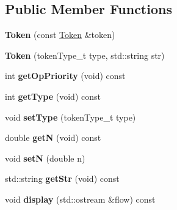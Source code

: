 \subsection*{Public Member Functions}
\begin{DoxyCompactItemize}
\item 
\hypertarget{class_token_a8196c5d239a5bf9d889dee11d559258e}{{\bfseries Token} (const \hyperlink{class_token}{Token} \&token)}\label{class_token_a8196c5d239a5bf9d889dee11d559258e}

\item 
\hypertarget{class_token_aada8246b17d062a3509461c86c7d45a4}{{\bfseries Token} (token\-Type\-\_\-t type, std\-::string str)}\label{class_token_aada8246b17d062a3509461c86c7d45a4}

\item 
\hypertarget{class_token_abb25d5ee4ed68713d45bf6a9259affc1}{int {\bfseries get\-Op\-Priority} (void) const }\label{class_token_abb25d5ee4ed68713d45bf6a9259affc1}

\item 
\hypertarget{class_token_a329a81e21cbcb1929df3aea9ff27a32c}{int {\bfseries get\-Type} (void) const }\label{class_token_a329a81e21cbcb1929df3aea9ff27a32c}

\item 
\hypertarget{class_token_ae6bbeac0c5da23d34f582856e911c8b2}{void {\bfseries set\-Type} (token\-Type\-\_\-t type)}\label{class_token_ae6bbeac0c5da23d34f582856e911c8b2}

\item 
\hypertarget{class_token_a2d5c2dc14215b3b443b3ba16d12a49aa}{double {\bfseries get\-N} (void) const }\label{class_token_a2d5c2dc14215b3b443b3ba16d12a49aa}

\item 
\hypertarget{class_token_a27e0713a82d278a603e4c430ff0204a3}{void {\bfseries set\-N} (double n)}\label{class_token_a27e0713a82d278a603e4c430ff0204a3}

\item 
\hypertarget{class_token_ad38a4d20573a9c6c4bc2447a4701b51d}{std\-::string {\bfseries get\-Str} (void) const }\label{class_token_ad38a4d20573a9c6c4bc2447a4701b51d}

\item 
\hypertarget{class_token_a04cb002bc8a1ca11487fa254a4455bf9}{void {\bfseries display} (std\-::ostream \&flow) const }\label{class_token_a04cb002bc8a1ca11487fa254a4455bf9}

\end{DoxyCompactItemize}
